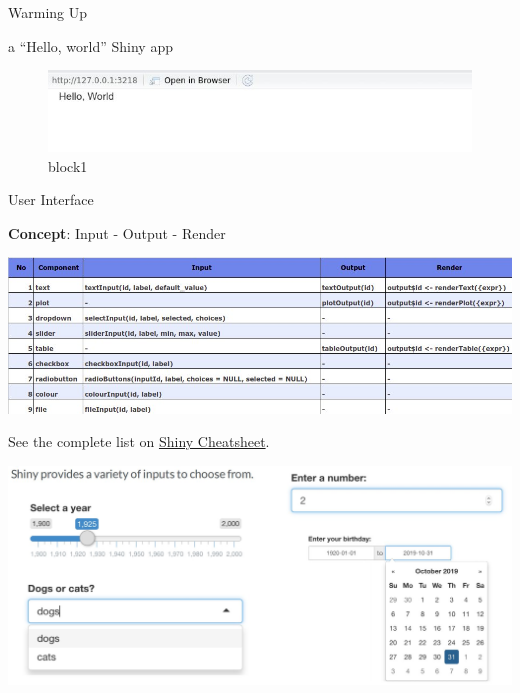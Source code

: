 \documentclass[
  ignorenonframetext,
]{beamer}
\begin{document}
\begin{frame}{Warming Up}
\protect\hypertarget{warming-up}{}

\begin{block}{a ``Hello, world'' Shiny app}

\begin{figure}
\centering
\includegraphics{images/hello_world2.jpg}
\caption{block1}
\end{figure}

\end{block}

\end{frame}

\begin{frame}{User Interface}
\protect\hypertarget{user-interface}{}

\textbf{Concept}: Input - Output - Render

\includegraphics{images/component.jpg}

\end{frame}

\begin{frame}

See the complete list on
\href{https://github.com/rstudio/cheatsheets/raw/master/shiny.pdf}{Shiny
Cheatsheet}.

\includegraphics{images/inputs.jpg}

\end{frame}
\end{document}
